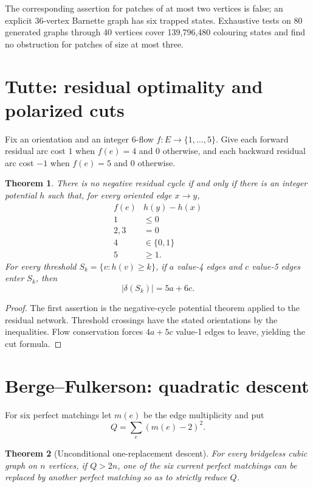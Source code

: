\documentclass[11pt]{article}
\newtheorem{theorem}{Theorem}
\begin{document}
The corresponding assertion for patches of at most two vertices is false;
an explicit 36-vertex Barnette graph has six trapped states.  Exhaustive
tests on 80 generated graphs through 40 vertices cover 139,796,480
colouring states and find no obstruction for patches of size at most three.

\section{Tutte: residual optimality and polarized cuts}
Fix an orientation and an integer 6-flow $f:E\to\{1,\ldots,5\}$.
Give each forward residual arc cost $1$ when $f(e)=4$ and $0$ otherwise,
and each backward residual arc cost $-1$ when $f(e)=5$ and $0$ otherwise.

\begin{theorem}
There is no negative residual cycle if and only if there is an integer
potential $h$ such that, for every oriented edge $x\to y$,
\[
\begin{array}{c|c}
 f(e)&h(y)-h(x)\\ \hline
 1&\le0\\
 2,3&=0\\
 4&\in\{0,1\}\\
 5&\ge1.
\end{array}
\]
For every threshold $S_k=\{v:h(v)\ge k\}$, if $a$ value-4 edges and
$c$ value-5 edges enter $S_k$, then
\[
 |\delta(S_k)|=5a+6c.
\]
\end{theorem}

\begin{proof}
The first assertion is the negative-cycle potential theorem applied to
the residual network.  Threshold crossings have the stated orientations
by the inequalities.  Flow conservation forces $4a+5c$ value-1 edges
to leave, yielding the cut formula.
\end{proof}

\section{Berge--Fulkerson: quadratic descent}
For six perfect matchings let $m(e)$ be the edge multiplicity and put
\[
 Q=\sum_e(m(e)-2)^2.
\]

\begin{theorem}[Unconditional one-replacement descent]
For every bridgeless cubic graph on $n$ vertices, if $Q>2n$, one of the
six current perfect matchings can be replaced by another perfect matching
so as to strictly reduce $Q$.
\end{theorem}
\end{document}
